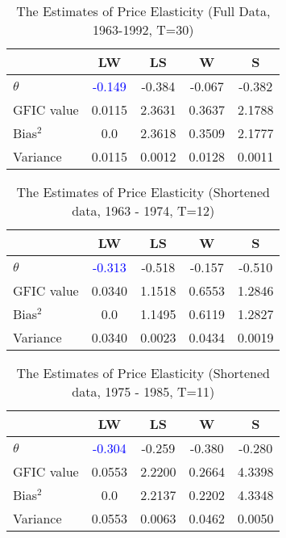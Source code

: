 \documentclass[11pt]{article}
\begin{document}
\begin{table}[h!]\centering
 \caption{The Estimates of Price Elasticity (Full Data, 1963-1992, T=30)}
\begin{tabular}{l c c c c }\hline\hline 
 & LW   &      LS   &       W   &      S\\
\hline
$\theta$ & \textcolor{blue}{-0.149} & -0.384 &  -0.067 &  -0.382\\
\hline
GFIC value &0.0115 & 2.3631 & 0.3637 &  2.1788\\
Bias$^2$ & 0.0 & 2.3618 & 0.3509 & 2.1777\\
Variance & 0.0115 & 0.0012 & 0.0128 & 0.0011\\ 
\hline
\hline
\end{tabular}
\end{table}



\begin{table}[h!]\centering
 \caption{The Estimates of Price Elasticity (Shortened data, 1963 - 1974, T=12)}
\begin{tabular}{l c c c c }\hline\hline 
 & LW   &      LS   &       W   &      S\\
\hline
$\theta$ & \textcolor{blue}{-0.313} & -0.518 &  -0.157 &  -0.510\\
\hline
GFIC value &0.0340 & 1.1518 & 0.6553 &  1.2846\\
Bias$^2$ & 0.0 & 1.1495 & 0.6119 & 1.2827\\
Variance & 0.0340 & 0.0023 & 0.0434 & 0.0019\\ 
\hline
\hline
\end{tabular}
\end{table}


\begin{table}[h!]\centering
 \caption{The Estimates of Price Elasticity (Shortened data, 1975 - 1985, T=11)}
\begin{tabular}{l c c c c }\hline\hline 
 & LW   &      LS   &       W   &      S\\
\hline
$\theta$ & \textcolor{blue}{-0.304} & -0.259 &  -0.380 &  -0.280\\
\hline
GFIC value &0.0553 & 2.2200 & 0.2664 &  4.3398\\
Bias$^2$ & 0.0 & 2.2137 & 0.2202 & 4.3348\\
Variance & 0.0553 & 0.0063 & 0.0462 & 0.0050\\ 
\hline
\hline
\end{tabular}
\end{table}
\end{document}
